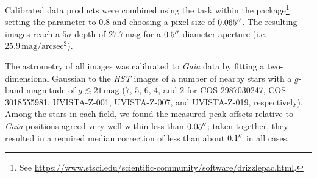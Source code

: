 Calibrated data products were combined using the  task \citep[e.g.][]{2002PASP..114..144F} within the  package\footnote{See \url{https://www.stsci.edu/scientific-community/software/drizzlepac.html}.} setting the  parameter to $0.8$ and choosing a pixel size of $0.065 \hbox{$^{\prime\prime}$}$. The resulting images reach a $5\sigma$ depth of $27.7 \, \mathrm{mag}$ for a $0.5 \hbox{$^{\prime\prime}$}$-diameter aperture (i.e. $25.9 \, \mathrm{mag/arcsec^2}$).

The astrometry of all images was calibrated to \textit{Gaia} data \citep{2016A&A...595A...1G, 2021A&A...649A...1G} by fitting a two-dimensional Gaussian to the \textit{HST} images of a number of nearby stars with a $g$-band magnitude of $g \lesssim 21 \, \mathrm{mag}$ ($7$, $5$, $6$, $4$, and $2$ for COS-2987030247, COS-3018555981, UVISTA-Z-001, UVISTA-Z-007, and UVISTA-Z-019, respectively). Among the stars in each field, we found the measured peak offsets relative to \textit{Gaia} positions agreed very well within less than $0.05 \hbox{$^{\prime\prime}$}$; taken together, they resulted in a required median correction of less than about $0.1 \hbox{$^{\prime\prime}$}$ in all cases.

